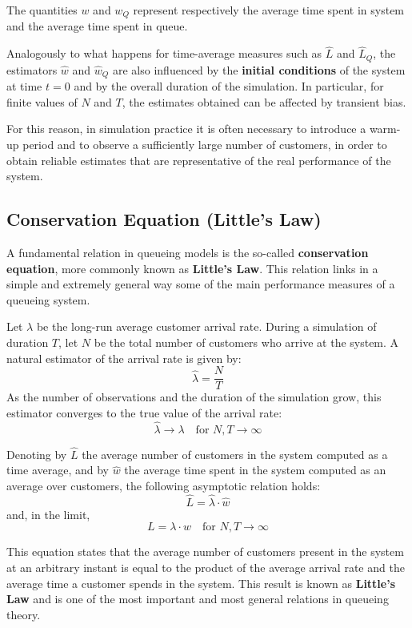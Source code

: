 The quantities $w$ and $w_Q$ represent respectively the average time spent in system and the average time spent in queue.

Analogously to what happens for time-average measures such as $\hat{L}$ and $\hat{L}_Q$, the estimators $\hat{w}$ and $\hat{w}_Q$ are also influenced by the \textbf{initial conditions} of the system at time $t = 0$ and by the overall duration of the simulation. In particular, for finite values of $N$ and $T$, the estimates obtained can be affected by transient bias.

For this reason, in simulation practice it is often necessary to introduce a warm-up period and to observe a sufficiently large number of customers, in order to obtain reliable estimates that are representative of the real performance of the system.

\subsection{Conservation Equation (Little’s Law)}

A fundamental relation in queueing models is the so-called \textbf{conservation equation}, more commonly known as \textbf{Little’s Law}. This relation links in a simple and extremely general way some of the main performance measures of a queueing system.

Let $\lambda$ be the long-run average customer arrival rate. During a simulation of duration $T$, let $N$ be the total number of customers who arrive at the system. A natural estimator of the arrival rate is given by:
\[
\hat{\lambda} = \frac{N}{T}
\]
As the number of observations and the duration of the simulation grow, this estimator converges to the true value of the arrival rate:
\[
\hat{\lambda} \longrightarrow \lambda \quad \text{for } N, T \to \infty
\]

Denoting by $\hat{L}$ the average number of customers in the system computed as a time average, and by $\hat{w}$ the average time spent in the system computed as an average over customers, the following asymptotic relation holds:
\[
\hat{L} = \hat{\lambda} \cdot \hat{w}
\]
and, in the limit,
\[
L = \lambda \cdot w \quad \text{for } N, T \to \infty
\]

This equation states that the average number of customers present in the system at an arbitrary instant is equal to the product of the average arrival rate and the average time a customer spends in the system. This result is known as \textbf{Little’s Law} and is one of the most important and most general relations in queueing theory.

